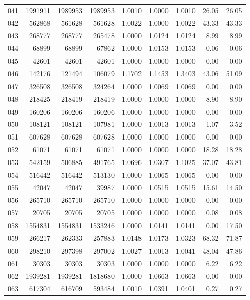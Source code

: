 \begin{longtable}{crrrrrrrr}
041 & 1991911 & 1989953 & 1989953 & 1.0010 & 1.0000 & 1.0010 & 26.05 & 26.05 \\
042 & 562868 & 561628 & 561628 & 1.0022 & 1.0000 & 1.0022 & 43.33 & 43.33 \\
043 & 268777 & 268777 & 265478 & 1.0000 & 1.0124 & 1.0124 & 8.99 & 8.99 \\
044 & 68899 & 68899 & 67862 & 1.0000 & 1.0153 & 1.0153 & 0.06 & 0.06 \\
045 & 42601 & 42601 & 42601 & 1.0000 & 1.0000 & 1.0000 & 0.00 & 0.00 \\
046 & 142176 & 121494 & 106079 & 1.1702 & 1.1453 & 1.3403 & 43.06 & 51.09 \\
047 & 326508 & 326508 & 324264 & 1.0000 & 1.0069 & 1.0069 & 0.00 & 0.00 \\
048 & 218425 & 218419 & 218419 & 1.0000 & 1.0000 & 1.0000 & 8.90 & 8.90 \\
049 & 160206 & 160206 & 160206 & 1.0000 & 1.0000 & 1.0000 & 0.00 & 0.00 \\
050 & 108121 & 108121 & 107981 & 1.0000 & 1.0013 & 1.0013 & 1.07 & 3.52 \\
051 & 607628 & 607628 & 607628 & 1.0000 & 1.0000 & 1.0000 & 0.00 & 0.00 \\
052 & 61071 & 61071 & 61071 & 1.0000 & 1.0000 & 1.0000 & 18.28 & 18.28 \\
053 & 542159 & 506885 & 491765 & 1.0696 & 1.0307 & 1.1025 & 37.07 & 43.81 \\
054 & 516442 & 516442 & 513130 & 1.0000 & 1.0065 & 1.0065 & 0.00 & 0.00 \\
055 & 42047 & 42047 & 39987 & 1.0000 & 1.0515 & 1.0515 & 15.61 & 14.50 \\
056 & 265710 & 265710 & 265710 & 1.0000 & 1.0000 & 1.0000 & 0.00 & 0.00 \\
057 & 20705 & 20705 & 20705 & 1.0000 & 1.0000 & 1.0000 & 0.08 & 0.08 \\
058 & 1554831 & 1554831 & 1533246 & 1.0000 & 1.0141 & 1.0141 & 0.00 & 17.50 \\
059 & 266217 & 262333 & 257883 & 1.0148 & 1.0173 & 1.0323 & 68.32 & 71.87 \\
060 & 298210 & 297398 & 297002 & 1.0027 & 1.0013 & 1.0041 & 48.04 & 47.86 \\
061 & 30303 & 30303 & 30303 & 1.0000 & 1.0000 & 1.0000 & 6.22 & 6.22 \\
062 & 1939281 & 1939281 & 1818680 & 1.0000 & 1.0663 & 1.0663 & 0.00 & 0.00 \\
063 & 617304 & 616709 & 593484 & 1.0010 & 1.0391 & 1.0401 & 0.27 & 0.27 \\

\end{longtable}
